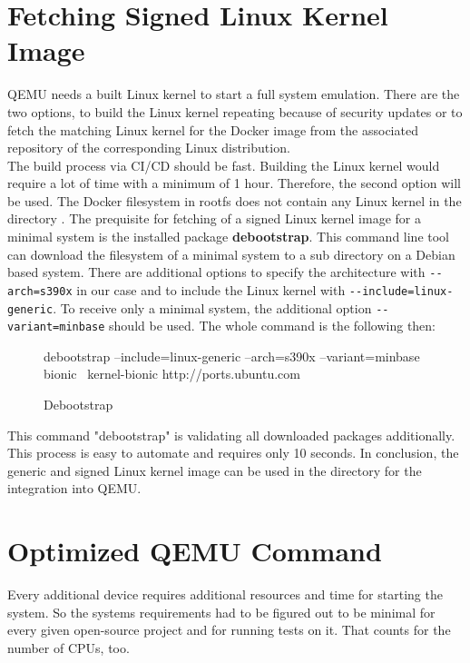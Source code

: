 \section{Fetching Signed Linux Kernel Image} \label{LinuxKernel}

QEMU needs a built Linux kernel to start a full system emulation. There are the two options, to build the Linux kernel repeating because of security updates or to fetch the matching Linux kernel for the Docker image from the associated repository of the corresponding Linux distribution. \\ 
The build process via CI/CD should be fast. Building the Linux kernel would require a lot of time with a minimum of 1 hour. Therefore, the second option will be used. The Docker filesystem in rootfs does not contain any Linux kernel in the directory .
The prequisite for fetching of a signed Linux kernel image for a minimal system is the installed package \textbf{debootstrap}. This command line tool can download the filesystem of a minimal system to a sub directory on a Debian based system. There are additional options to specify the architecture with \lstinline!--arch=s390x! in our case and to include the Linux kernel with \lstinline!--include=linux-generic!. To receive only a minimal system, the additional option \lstinline!--variant=minbase! should be used. The whole command is the following then: \\
\begin{figure}[H]
\begin{boxedverbatim}
debootstrap --include=linux-generic --arch=s390x --variant=minbase bionic \
kernel-bionic http://ports.ubuntu.com 
\end{boxedverbatim}
\caption{Debootstrap}
    \label{Debootstrap}
\end{figure}

This command "debootstrap" is validating all downloaded packages additionally. This process is easy to automate and requires only 10 seconds. In conclusion, the generic and signed Linux kernel image can be used in the  directory for the integration into QEMU.
 

\section{Optimized QEMU Command}\label{Optimized-Qemu-Command}

Every additional device requires additional resources and time for starting the system. 
So the systems requirements had to be figured out to be minimal for every given open-source project and for running tests on it. 
That counts for the number of CPUs, too. \\

